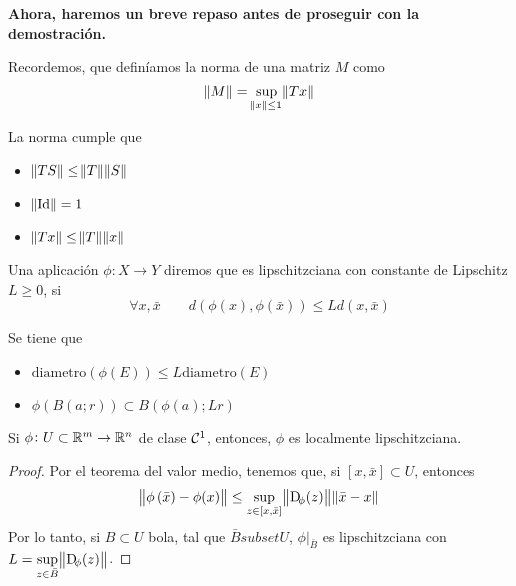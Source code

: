 \textbf{Ahora, haremos un breve repaso antes de proseguir con la demostración.}

\begin{defi*}
    Recordemos, que definíamos la norma de una matriz $M$ como
    \[
        \norm{M} = \sup_{\norm{x} \leq 1} \norm{T x}
    \]
\end{defi*}

\begin{prop*}
    La norma cumple que
    \begin{itemize}
        \item $\norm{TS} \leq \norm{T}\norm{S}$
        \item $\norm{\operatorname{Id}} = 1$
        \item $\norm{Tx} \leq \norm{T} \norm{x}$
    \end{itemize}
\end{prop*}

\begin{defi*}
    Una aplicación $\phi \colon X \to Y$ diremos que es lipschitzciana con constante de Lipschitz $L \geq 0$, si
    \[
        \forall x, \bar{x} \qquad
        d\left( \phi(x), \phi\left( \bar{x} \right) \right) \leq L d\left( x, \bar{x} \right)
    \]
\end{defi*}

\begin{obs*}
    Se tiene que
    \begin{itemize}
        \item $\text{diametro}\left( \phi(E) \right) \leq L \text{diametro}(E)$
        \item $\phi\left( B(a; r) \right) \subset B\left( \phi(a); Lr \right)$
    \end{itemize}
\end{obs*}

\begin{prop*}
    Si $\phi \colon U \subset \mathbb{R}^m \to \mathbb{R}^n$ de clase $\mathcal{C}^1$, entonces, $\phi$ es localmente lipschitzciana.
\end{prop*}

\begin{proof}
    Por el teorema del valor medio, tenemos que, si $[x, \bar{x}] \subset U$, entonces
    \[
        \norm{\phi\left( \bar{x} \right) - \phi(x)} \leq \sup_{z \in [x, \bar{x}]} \norm{\Dif_\phi(z)} \norm{\bar{x} - x} 
    \]
    Por lo tanto, si $B \subset U$ bola, tal que $\bar{B}   subset U$, $\phi\vert_{\bar{B}}$ es lipschitzciana con $L = \sup\limits_{z \in \bar{B}} \norm{\Dif_\phi(z)}$.
\end{proof}

